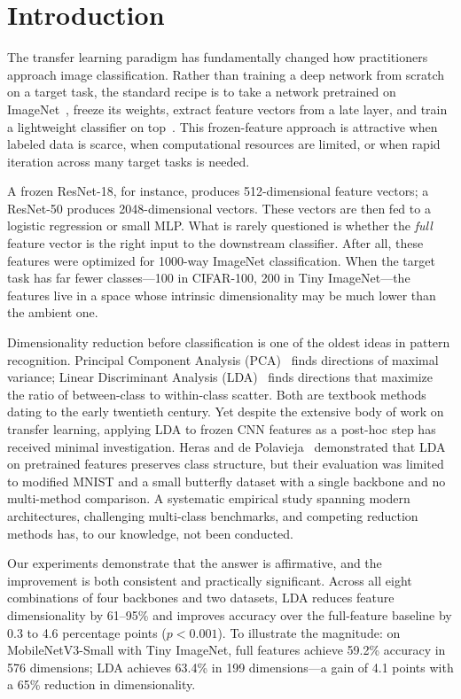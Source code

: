 \section{Introduction}
\label{sec:introduction}

The transfer learning paradigm has fundamentally changed how practitioners approach image classification. Rather than training a deep network from scratch on a target task, the standard recipe is to take a network pretrained on ImageNet~\cite{deng2009imagenet}, freeze its weights, extract feature vectors from a late layer, and train a lightweight classifier on top~\cite{donahue2014decaf, sharif2014cnn, kornblith2019better}. This frozen-feature approach is attractive when labeled data is scarce, when computational resources are limited, or when rapid iteration across many target tasks is needed.

A frozen ResNet-18, for instance, produces 512-dimensional feature vectors; a ResNet-50 produces 2048-dimensional vectors. These vectors are then fed to a logistic regression or small MLP. What is rarely questioned is whether the \emph{full} feature vector is the right input to the downstream classifier. After all, these features were optimized for 1000-way ImageNet classification. When the target task has far fewer classes---100 in CIFAR-100, 200 in Tiny ImageNet---the features live in a space whose intrinsic dimensionality may be much lower than the ambient one.

Dimensionality reduction before classification is one of the oldest ideas in pattern recognition. Principal Component Analysis (PCA)~\cite{pearson1901pca, jolliffe2002pca} finds directions of maximal variance; Linear Discriminant Analysis (LDA)~\cite{fisher1936lda, rao1948utilization} finds directions that maximize the ratio of between-class to within-class scatter. Both are textbook methods dating to the early twentieth century. Yet despite the extensive body of work on transfer learning, applying LDA to frozen CNN features as a post-hoc step has received minimal investigation. Heras and de Polavieja~\cite{heras2020lda_cnn} demonstrated that LDA on pretrained features preserves class structure, but their evaluation was limited to modified MNIST and a small butterfly dataset with a single backbone and no multi-method comparison. A systematic empirical study spanning modern architectures, challenging multi-class benchmarks, and competing reduction methods has, to our knowledge, not been conducted.

Our experiments demonstrate that the answer is affirmative, and the improvement is both consistent and practically significant. Across all eight combinations of four backbones and two datasets, LDA reduces feature dimensionality by 61--95\% and improves accuracy over the full-feature baseline by 0.3 to 4.6 percentage points ($p < 0.001$). To illustrate the magnitude: on MobileNetV3-Small with Tiny ImageNet, full features achieve 59.2\% accuracy in 576 dimensions; LDA achieves 63.4\% in 199 dimensions---a gain of 4.1 points with a 65\% reduction in dimensionality.

